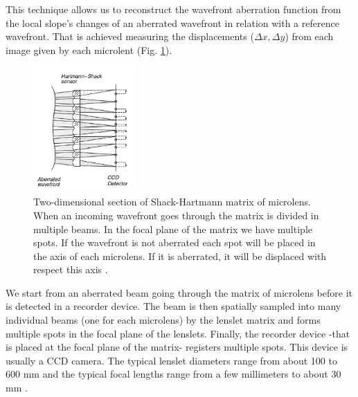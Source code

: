 This technique allows us to reconstruct the wavefront aberration function from the local slope's changes of an aberrated wavefront in relation with a reference wavefront. That is achieved measuring the displacements ($\Delta x, \Delta y$) from each image given by each microlent (Fig. \ref{fig:SH}).

\begin{figure}[htbp]
	\centering
		\includegraphics[width=0.35\textwidth]{images/SH.png}
	\caption{Two-dimensional section of Shack-Hartmann matrix of microlens. When an incoming wavefront goes through the matrix is divided in multiple beams. In the focal plane of the matrix we have multiple spots. If the wavefront is not aberrated each spot will be placed in the axis of each microlens. If it is aberrated, it will be displaced with respect this axis \cite{optical_shop_testing}.}
	\label{fig:SH}
\end{figure}


We start from an aberrated beam going through the matrix of microlens before it is detected in a recorder device. The beam is then spatially sampled into many individual beams (one for each microlens) by the lenslet matrix and forms multiple spots in the focal plane of the lenslets. Finally, the recorder device -that is placed at the focal plane of the matrix- registers multiple spots. This device is usually a CCD camera. The typical lenslet diameters range from about 100 to 600 mm and the typical focal lengths range from a few millimeters to about 30 mm \cite{AO_vision_science}.
  
